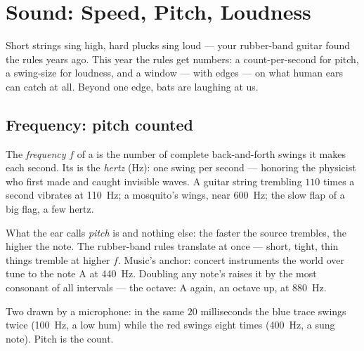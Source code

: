 \chapter{Sound: Speed, Pitch, Loudness}\label{ch:g8:sound-pitch-loudness}

Short strings sing high, hard plucks sing loud --- your
rubber-band guitar found the rules years ago. This year the
rules get numbers: a count-per-second for pitch, a swing-size
for loudness, and a window --- with edges --- on what human
ears can catch at all. Beyond one edge, bats are laughing at
us.

\section{Frequency: pitch counted}

\begin{definition}[Frequency]\label{def:g8:sound-pitch-loudness:frequency}
The \emph{frequency} $f$ of a  is
the number of complete back-and-forth swings it makes each
second. Its  is the \emph{hertz} (\unit{Hz}):
one swing per second --- honoring the physicist who first made
and caught invisible waves. A guitar string trembling $110$
times a second vibrates at \qty{110}{Hz}; a mosquito's wings,
near \qty{600}{Hz}; the slow flap of a big flag, a few hertz.
\end{definition}

\begin{proposition}\label{prop:g8:sound-pitch-loudness:pitch}
What the ear calls \emph{pitch} is  and nothing
else: the faster the source trembles, the higher the note.
The rubber-band rules translate at once --- short, tight,
thin things tremble at higher $f$. Music's anchor: concert
instruments the world over tune to the note A at
\qty{440}{Hz}. Doubling any note's  raises it by the
most consonant of all intervals --- the octave: A again, an
octave up, at \qty{880}{Hz}.
\end{proposition}

\begin{omfigure}

{\small Two  drawn by a microphone: in the same $20$
milliseconds the blue trace swings twice (\qty{100}{Hz}, a low
hum) while the red swings eight times (\qty{400}{Hz}, a sung
note). Pitch is the count.}
\end{omfigure}


